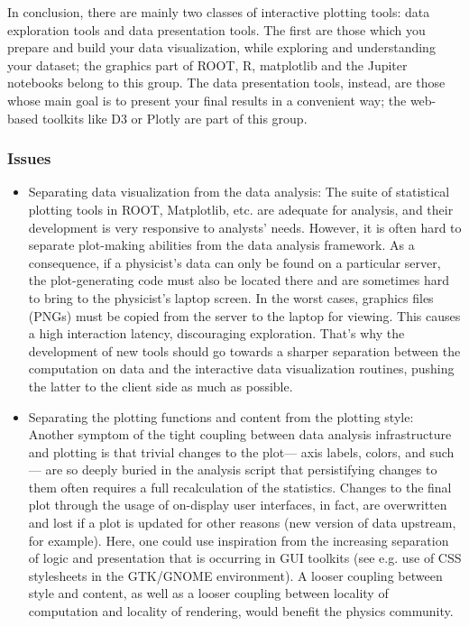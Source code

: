 \documentclass[12pt,a4paper]{article}
\begin{document}
In conclusion, there are mainly two classes of interactive plotting tools: data exploration tools and data presentation tools.
The first are those which you prepare and build your data visualization, while exploring and understanding your dataset;
the graphics part of ROOT, R, matplotlib and the Jupiter notebooks belong to this group. The data presentation tools, instead,
are those whose main goal is to present your final results in a convenient way; the web-based toolkits like D3 or Plotly
are part of this group.

\hypertarget{stats-issues}{%
\subsubsection{Issues}\label{stats-issues}}

\begin{itemize}
\item Separating data visualization from the data analysis:
The suite of statistical plotting tools in ROOT, Matplotlib, etc. are adequate for analysis, and their development is
very responsive to analysts’ needs. However, it is often hard to separate plot-making abilities from the data analysis framework.
As a consequence, if a physicist’s data can only be found on a particular server, the plot-generating code must also be located
there and are sometimes hard to bring to the physicist’s laptop screen. In the worst cases, graphics files (PNGs) must be copied
from the server to the laptop for viewing. This causes a high interaction latency, discouraging exploration. That’s why the
development of new tools should go towards a sharper separation between the computation on data and the interactive data visualization
routines, pushing the latter to the client side as much as possible.

\item Separating the plotting functions and content from the plotting style:
Another symptom of the tight coupling between data analysis infrastructure and plotting is that trivial changes to the plot— axis labels,
colors, and such— are so deeply buried in the analysis script that persistifying changes to them often requires a full recalculation
of the statistics. Changes to the final plot through the usage of on-display user interfaces, in fact, are overwritten and lost if a
plot is updated for other reasons (new version of data upstream, for example). Here, one could use inspiration from the increasing
separation of logic and presentation that is occurring in GUI toolkits (see e.g. use of CSS stylesheets in the GTK/GNOME environment).
A looser coupling between style and content, as well as a looser coupling between locality of computation and locality of rendering,
would benefit the physics community.
\end{itemize}
\end{document}
